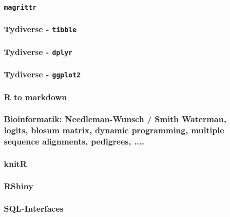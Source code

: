 \documentclass[paper=A4, pagesize, DIV=calc, smallheadings,
fontsize=12pt, expansion=false]{scrreprt}
\begin{document}
\subsubsection{\texttt{magrittr}}

\subsubsection{Tydiverse - \texttt{tibble}}

\subsubsection{Tydiverse - \texttt{dplyr}}

\subsubsection{Tydiverse - \texttt{ggplot2}}

\subsubsection{R to markdown}

\subsubsection{Bioinformatik: Needleman-Wunsch / Smith Waterman, logits, blosum matrix, dynamic 
  programming, multiple sequence alignments, pedigrees, ....}

\subsubsection{knitR}

\subsubsection{RShiny}

\subsubsection{SQL-Interfaces}
\end{document}
